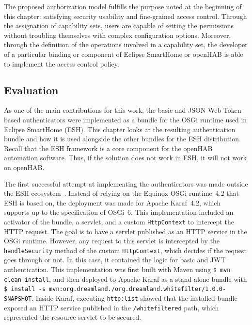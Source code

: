 \documentclass[12pt]{article}
\begin{document}
The proposed authorization model fulfills the purpose noted at the beginning of this chapter: satisfying security usability and fine-grained access control. Through the assignation of capability sets, users are capable of setting the permissions without troubling themselves with complex configuration options. Moreover, through the definition of the operations involved in a capability set, the developer of a particular binding or component of Eclipse SmartHome or openHAB is able to implement the access control policy.

\subsection{Evaluation}
\label{sec:eval}

As one of the main contributions for this work, the basic and JSON Web Token-based authenticators were implemented as a bundle for the OSGi runtime used in Eclipse SmartHome (ESH). This chapter looks at the resulting authentication bundle and how it is used alongside the other bundles for the ESH distribution. Recall that the ESH framework is a core component for the openHAB automation software. Thus, if the solution does not work in ESH, it will not work on openHAB.

The first successful attempt at implementing the authenticators was made outside the ESH ecosystem~\cite{repo_02}. Instead of relying on the Equinox OSGi runtime~4.2 that ESH is based on, the deployment was made for Apache Karaf~4.2, which supports up to the specification of OSGi~6. This implementation included an activator of the bundle, a servlet, and a custom \texttt{HttpContext} to intercept the HTTP request. The goal is to have a servlet published as an HTTP service in the OSGi runtime. However, any request to this servlet is intercepted by the \texttt{handleSecurity} method of the custom \texttt{HttpContext}, which decides if the request goes through or not. In this case, it contained the logic for basic and JWT authentication. This implementation was first built with Maven using \texttt{\$ mvn clean install}, and then deployed to Apache Karaf as a stand-alone bundle with \texttt{\$ install -s mvn:org.dreamland./org.dreamland.whitefilter/1.0.0-SNAPSHOT}. Inside Karaf, executing \texttt{http:list} showed that the installed bundle exposed an HTTP service published in the \texttt{/whitefiltered} path, which represented the resource servlet to be secured.
\end{document}

